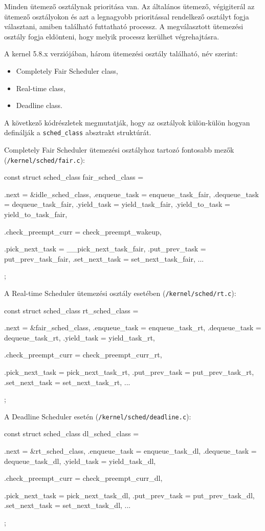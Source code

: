Minden ütemező osztálynak prioritása van. 
Az általános ütemező, végigiterál az ütemező osztályokon és azt a legnagyobb prioritással rendelkező osztályt fogja választani, amiben található futtatható processz. A megválasztott ütemezési osztály fogja eldönteni, hogy melyik processz kerülhet végrehajtásra.

A kernel 5.8.x verziójában, három ütemezési osztály található, név szerint: 
\begin{itemize}
	 \item Completely Fair Scheduler class,
	 \item Real-time class,
	 \item Deadline class.
\end{itemize}
A következő kódrészletek megmutatják, hogy az osztályok külön-külön hogyan definálják a \texttt{sched\_class} absztrakt struktúrát.

Completely Fair Scheduler ütemezési osztályhoz tartozó fontosabb mezők (\texttt{/kernel/sched/fair.c}):
\begin{cpp}
const struct sched_class fair_sched_class = {
	.next			= &idle_sched_class,
	.enqueue_task		= enqueue_task_fair,
	.dequeue_task		= dequeue_task_fair,
	.yield_task		= yield_task_fair,
	.yield_to_task		= yield_to_task_fair,

	.check_preempt_curr	= check_preempt_wakeup,

	.pick_next_task		= __pick_next_task_fair,
	.put_prev_task		= put_prev_task_fair,
	.set_next_task          = set_next_task_fair,
...
};
\end{cpp}

A Real-time Scheduler ütemezési osztály esetében (\texttt{/kernel/sched/rt.c}):
\begin{cpp}
const struct sched_class rt_sched_class = {
	.next			= &fair_sched_class,
	.enqueue_task		= enqueue_task_rt,
	.dequeue_task		= dequeue_task_rt,
	.yield_task		= yield_task_rt,

	.check_preempt_curr	= check_preempt_curr_rt,

	.pick_next_task		= pick_next_task_rt,
	.put_prev_task		= put_prev_task_rt,
	.set_next_task          = set_next_task_rt,
...
};
\end{cpp}

A Deadline Scheduler esetén (\texttt{/kernel/sched/deadline.c}):
\begin{cpp}
const struct sched_class dl_sched_class = {
	.next			= &rt_sched_class,
	.enqueue_task		= enqueue_task_dl,
	.dequeue_task		= dequeue_task_dl,
	.yield_task		= yield_task_dl,

	.check_preempt_curr	= check_preempt_curr_dl,

	.pick_next_task		= pick_next_task_dl,
	.put_prev_task		= put_prev_task_dl,
	.set_next_task		= set_next_task_dl,
...
};
\end{cpp}

